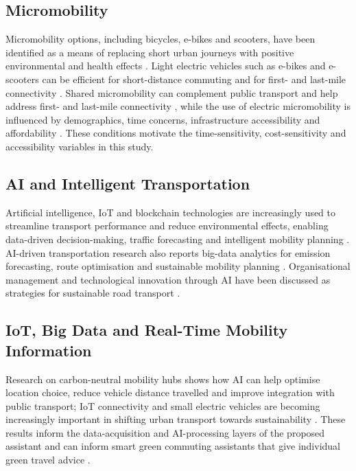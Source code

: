 \documentclass[11pt,a4paper]{article}
\begin{document}
\subsection{Micromobility}
Micromobility options, including bicycles, e-bikes and scooters, have been identified as a means of
replacing short urban journeys with positive environmental and health effects \citep{comi2024}.
Light electric vehicles such as e-bikes and e-scooters can be efficient for short-distance commuting
and for first- and last-mile connectivity \citep{mogire2025}. Shared micromobility can complement
public transport and help address first- and last-mile connectivity \citep{cui2024}, while the use of
electric micromobility is influenced by demographics, time concerns, infrastructure accessibility and
affordability \citep{wu2025}. These conditions motivate the time-sensitivity, cost-sensitivity and
accessibility variables in this study.

\subsection{AI and Intelligent Transportation}
Artificial intelligence, IoT and blockchain technologies are increasingly used to streamline
transport performance and reduce environmental effects, enabling data-driven decision-making,
traffic forecasting and intelligent mobility planning \citep{kashem2025}. AI-driven transportation
research also reports big-data analytics for emission forecasting, route optimisation and sustainable
mobility planning \citep{ouyang2025}. Organisational management and technological innovation through
AI have been discussed as strategies for sustainable road transport \citep{liu2025}.

\subsection{IoT, Big Data and Real-Time Mobility Information}
Research on carbon-neutral mobility hubs shows how AI can help optimise location choice, reduce
vehicle distance travelled and improve integration with public transport; IoT connectivity and small
electric vehicles are becoming increasingly important in shifting urban transport towards
sustainability \citep{kashem2025,mogire2025}. These results inform the data-acquisition and
AI-processing layers of the proposed assistant and can inform smart green commuting assistants that
give individual green travel advice \citep{kashem2025}.
\end{document}
